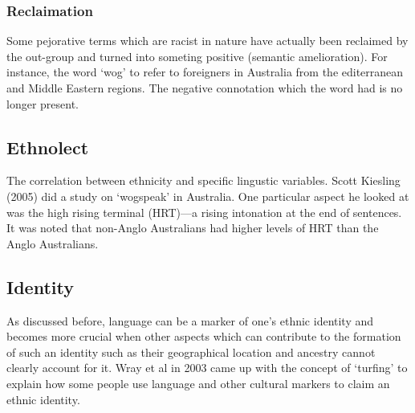 \documentclass[../main.tex]{subfiles}
\begin{document}
    \subsubsection{Reclaimation}
    Some pejorative terms which are racist in nature have actually been reclaimed by the out-group and turned into someting positive (semantic amelioration). For instance, the word `wog' to refer to foreigners in Australia from the editerranean and Middle Eastern regions. The negative connotation which the word had is no longer present. 

    \subsection{Ethnolect}
    The correlation between ethnicity and specific lingustic variables. Scott Kiesling (2005) did a study on `wogspeak' in Australia. One particular aspect he looked at was the high rising terminal (HRT)---a rising intonation at the end of sentences. It was noted that non-Anglo Australians had higher levels of HRT than the Anglo Australians.

    \subsection{Identity}
    As discussed before, language can be a marker of one's ethnic identity and becomes more crucial when other aspects which can contribute to the formation of such an identity such as their geographical location and ancestry cannot clearly account for it. Wray et al in 2003 came up with the concept of `turfing' to explain how some people use language and other cultural markers to claim an ethnic identity. 
\end{document}
